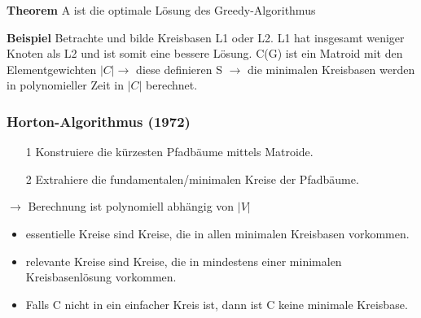 \textbf{Theorem} \newline A ist die optimale Lösung des Greedy-Algorithmus \newline

\textbf{Beispiel} \newline Betrachte und bilde Kreisbasen L1 oder L2. L1 hat insgesamt weniger Knoten als L2 und ist somit eine bessere Lösung. C(G) ist ein Matroid mit den Elementgewichten $|C| \rightarrow$ diese definieren S $\rightarrow$ die minimalen Kreisbasen werden in polynomieller Zeit in $|C|$ berechnet.
\subsubsection{Horton-Algorithmus (1972)}
\begin{itemize}
	\item[1]Konstruiere die kürzesten Pfadbäume mittels Matroide. 
	\item[2]Extrahiere die fundamentalen/minimalen Kreise der Pfadbäume.
\end{itemize}
$\rightarrow$ Berechnung ist polynomiell abhängig von $|V|$
\begin{itemize}
	\item essentielle Kreise sind Kreise, die in allen minimalen Kreisbasen vorkommen. 
	\item relevante Kreise sind Kreise, die in mindestens einer minimalen Kreisbasenlösung vorkommen.
	\item Falls C nicht in ein einfacher Kreis ist, dann ist C keine minimale Kreisbase.
\end{itemize}

\newpage
